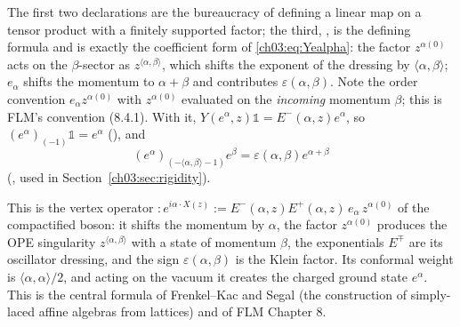 \begin{dictionary}
The first two declarations are the bureaucracy of defining a linear map on a tensor product with
a finitely supported factor; the third, , is the defining formula and is exactly
the coefficient form of \eqref{ch03:eq:Yealpha}: the factor $z^{\alpha(0)}$ acts on the
$\beta$-sector as $z^{\langle\alpha,\beta\rangle}$, which shifts the exponent  of the
dressing by $\langle\alpha,\beta\rangle$; $e_\alpha$ shifts the momentum to $\alpha+\beta$ and
contributes $\varepsilon(\alpha,\beta)$. Note the order convention $e_\alpha z^{\alpha(0)}$ with
$z^{\alpha(0)}$ evaluated on the \emph{incoming} momentum $\beta$; this is FLM's convention
(8.4.1). With it, $Y(e^\alpha,z)\mathbb 1=E^-(\alpha,z)e^\alpha$, so $(e^\alpha)_{(-1)}\mathbb 1=
e^\alpha$ (), and
\begin{equation*}
  (e^\alpha)_{(-\langle\alpha,\beta\rangle-1)}e^\beta=\varepsilon(\alpha,\beta)e^{\alpha+\beta}
\end{equation*}
(, used in Section~\ref{ch03:sec:rigidity}).
\end{dictionary}

\begin{physics}
This is the vertex operator $:\!e^{i\alpha\cdot X(z)}\!:=E^-(\alpha,z)E^+(\alpha,z)\,e_\alpha\,z^{\alpha(0)}$ of the compactified boson: it shifts the momentum by $\alpha$, the factor $z^{\alpha(0)}$ produces the OPE singularity $z^{\langle\alpha,\beta\rangle}$ with a state of momentum $\beta$, the exponentials $E^\mp$ are its oscillator dressing, and the sign $\varepsilon(\alpha,\beta)$ is the Klein factor. Its conformal weight is $\langle\alpha,\alpha\rangle/2$, and acting on the vacuum it creates the charged ground state $e^\alpha$. This is the central formula of Frenkel--Kac and Segal (the construction of simply-laced affine algebras from lattices) and of FLM Chapter 8.
\end{physics}

